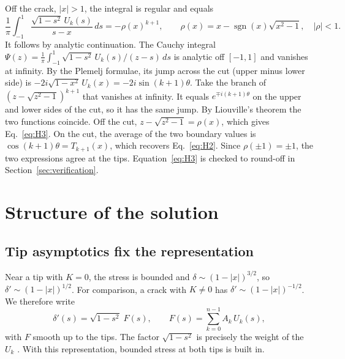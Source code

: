 \documentclass[12pt]{article}
\newcommand{\sgn}{\operatorname{sgn}}
\begin{document}
Off the crack, $|x|>1$, the integral is regular and equals
\begin{equation}\label{eq:H3}
	\frac1\pi\int_{-1}^{1}\frac{\sqrt{1-s^2}\,U_k(s)}{s-x}\,ds = -\rho(x)^{k+1},
	\qquad \rho(x) = x - \sgn(x)\sqrt{x^2-1},\quad |\rho|<1 .
\end{equation}
It follows by analytic continuation. The Cauchy integral
$\Psi(z) = \frac1\pi\int_{-1}^{1}\sqrt{1-s^2}\,U_k(s)/(z-s)\,ds$ is analytic off
$[-1,1]$ and vanishes at infinity. By the Plemelj formulae, its jump across the
cut (upper minus lower side) is $-2i\sqrt{1-x^2}\,U_k(x) = -2i\sin(k+1)\theta$.
Take the branch of $(z-\sqrt{z^2-1})^{k+1}$ that vanishes at infinity. It equals
$e^{\mp i(k+1)\theta}$ on the upper and lower sides of the cut, so it has the
same jump. By Liouville's theorem the two functions coincide. Off the cut,
$z-\sqrt{z^2-1} = \rho(x)$, which gives Eq.~\eqref{eq:H3}. On the cut, the
average of the two boundary values is $\cos(k+1)\theta = T_{k+1}(x)$, which
recovers Eq.~\eqref{eq:H2}. Since $\rho(\pm1) = \pm1$, the two expressions agree
at the tips.
Equation~\eqref{eq:H3} is checked to round-off in Section~\ref{sec:verification}.

\section{Structure of the solution}\label{sec:structure}

\subsection{Tip asymptotics fix the representation}
Near a tip with $K=0$, the stress is bounded and $\delta\sim(1-|x|)^{3/2}$, so
$\delta'\sim(1-|x|)^{1/2}$. For comparison, a crack with $K\ne0$ has
$\delta'\sim(1-|x|)^{-1/2}$. We therefore write
\begin{equation}\label{eq:ansatz}
	\delta'(s) = \sqrt{1-s^2}\;F(s),
	\qquad F(s) = \sum_{k=0}^{n-1} A_k\,U_k(s),
\end{equation}
with $F$ smooth up to the tips. The factor $\sqrt{1-s^2}$ is precisely the
weight of the $U_k$ \parencite[Table~1]{ViescaGaragash2018}. With this
representation, bounded stress at both tips is built in.
\end{document}
